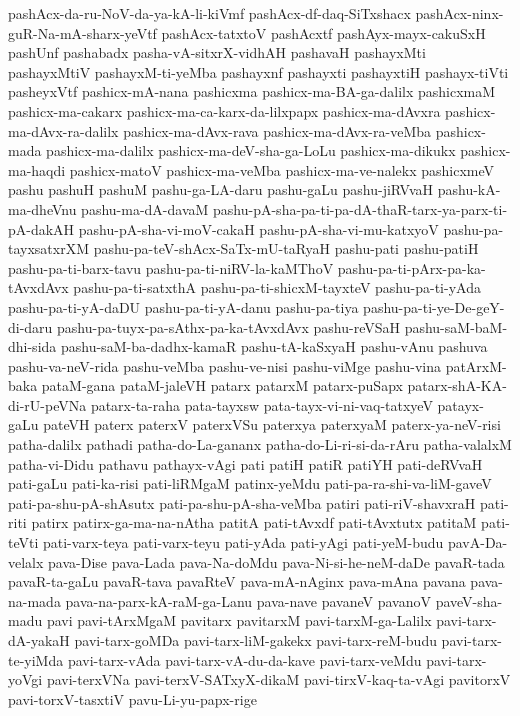 {pashAcx-da-ru-NoV-da-ya-kA-li-kiVmf
pashAcx-df-daq-SiTxshacx
pashAcx-ninx-guR-Na-mA-sharx-yeVtf
pashAcx-tatxtoV
pashAcxtf
pashAyx-mayx-cakuSxH
pashUnf
pashabadx
pasha-vA-sitxrX-vidhAH
pashavaH
pashayxMti
pashayxMtiV
pashayxM-ti-yeMba
pashayxnf
pashayxti
pashayxtiH
pashayx-tiVti
pasheyxVtf
pashicx-mA-nana
pashicxma
pashicx-ma-BA-ga-dalilx
pashicxmaM
pashicx-ma-cakarx
pashicx-ma-ca-karx-da-lilxpapx
pashicx-ma-dAvxra
pashicx-ma-dAvx-ra-dalilx
pashicx-ma-dAvx-rava
pashicx-ma-dAvx-ra-veMba
pashicx-mada
pashicx-ma-dalilx
pashicx-ma-deV-sha-ga-LoLu
pashicx-ma-dikukx
pashicx-ma-haqdi
pashicx-matoV
pashicx-ma-veMba
pashicx-ma-ve-nalekx
pashicxmeV
pashu
pashuH
pashuM
pashu-ga-LA-daru
pashu-gaLu
pashu-jiRVvaH
pashu-kA-ma-dheVnu
pashu-ma-dA-davaM
pashu-pA-sha-pa-ti-pa-dA-thaR-tarx-ya-parx-ti-pA-dakAH
pashu-pA-sha-vi-moV-cakaH
pashu-pA-sha-vi-mu-katxyoV
pashu-pa-tayxsatxrXM
pashu-pa-teV-shAcx-SaTx-mU-taRyaH
pashu-pati
pashu-patiH
pashu-pa-ti-barx-tavu
pashu-pa-ti-niRV-la-kaMThoV
pashu-pa-ti-pArx-pa-ka-tAvxdAvx
pashu-pa-ti-satxthA
pashu-pa-ti-shicxM-tayxteV
pashu-pa-ti-yAda
pashu-pa-ti-yA-daDU
pashu-pa-ti-yA-danu
pashu-pa-tiya
pashu-pa-ti-ye-De-geY-di-daru
pashu-pa-tuyx-pa-sAthx-pa-ka-tAvxdAvx
pashu-reVSaH
pashu-saM-baM-dhi-sida
pashu-saM-ba-dadhx-kamaR
pashu-tA-kaSxyaH
pashu-vAnu
pashuva
pashu-va-neV-rida
pashu-veMba
pashu-ve-nisi
pashu-viMge
pashu-vina
patArxM-baka
pataM-gana
pataM-jaleVH
patarx
patarxM
patarx-puSapx
patarx-shA-KA-di-rU-peVNa
patarx-ta-raha
pata-tayxsw
pata-tayx-vi-ni-vaq-tatxyeV
patayx-gaLu
pateVH
paterx
paterxV
paterxVSu
paterxya
paterxyaM
paterx-ya-neV-risi
patha-dalilx
pathadi
patha-do-La-gananx
patha-do-Li-ri-si-da-rAru
patha-valalxM
patha-vi-Didu
pathavu
pathayx-vAgi
pati
patiH
patiR
patiYH
pati-deRVvaH
pati-gaLu
pati-ka-risi
pati-liRMgaM
patinx-yeMdu
pati-pa-ra-shi-va-liM-gaveV
pati-pa-shu-pA-shAsutx
pati-pa-shu-pA-sha-veMba
patiri
pati-riV-shavxraH
pati-riti
patirx
patirx-ga-ma-na-nAtha
patitA
pati-tAvxdf
pati-tAvxtutx
patitaM
pati-teVti
pati-varx-teya
pati-varx-teyu
pati-yAda
pati-yAgi
pati-yeM-budu
pavA-Da-velalx
pava-Dise
pava-Lada
pava-Na-doMdu
pava-Ni-si-he-neM-daDe
pavaR-tada
pavaR-ta-gaLu
pavaR-tava
pavaRteV
pava-mA-nAginx
pava-mAna
pavana
pava-na-mada
pava-na-parx-kA-raM-ga-Lanu
pava-nave
pavaneV
pavanoV
paveV-sha-madu
pavi
pavi-tArxMgaM
pavitarx
pavitarxM
pavi-tarxM-ga-Lalilx
pavi-tarx-dA-yakaH
pavi-tarx-goMDa
pavi-tarx-liM-gakekx
pavi-tarx-reM-budu
pavi-tarx-te-yiMda
pavi-tarx-vAda
pavi-tarx-vA-du-da-kave
pavi-tarx-veMdu
pavi-tarx-yoVgi
pavi-terxVNa
pavi-terxV-SATxyX-dikaM
pavi-tirxV-kaq-ta-vAgi
pavitorxV
pavi-torxV-tasxtiV
pavu-Li-yu-papx-rige
}
